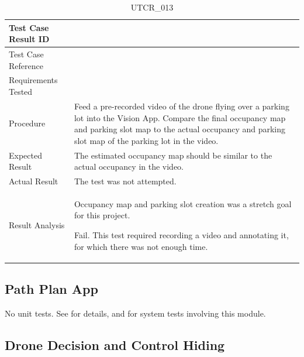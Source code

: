 \documentclass[12pt, titlepage]{article}
\begin{document}
\begin{table}[!h]
\begin{center}
\caption {UTCR\_013}
\label{tab:UTCR_013}
\begin{tabular}{ | m{3.2cm} | m{12.2cm} | } 
\hline
Test Case Result ID & \nameref{tab:UTCR_013} \\ 
\hline
Test Case Reference & \nameref{tab:UTC_013}  \\ 
\hline
Requirements Tested & \nameref{GEN_002}\\ 
\hline
Procedure &  Feed a pre-recorded video of the drone flying over a parking lot into the Vision App. Compare the final occupancy map and parking slot map to the actual occupancy  and parking slot map of the parking lot in the video.\\ 
\hline
Expected Result & The estimated occupancy map should be similar to the actual occupancy in the video. \\ 
\hline
Actual Result & The test was not attempted. \\ 
\hline
Result Analysis & Occupancy map and parking slot creation was a stretch goal for this project.

Fail. This test required recording a video and annotating it, for which there was not enough time.  \\ 
\hline
\end{tabular}
\end{center}
\end{table}

\clearpage

\subsection{Path Plan App}
\label{subsec:pathPlanApp}

No unit tests. See  for details, and  for system tests involving this module.

\subsection{Drone Decision and Control Hiding}
\label{subsec:ddcHiding}
\end{document}
